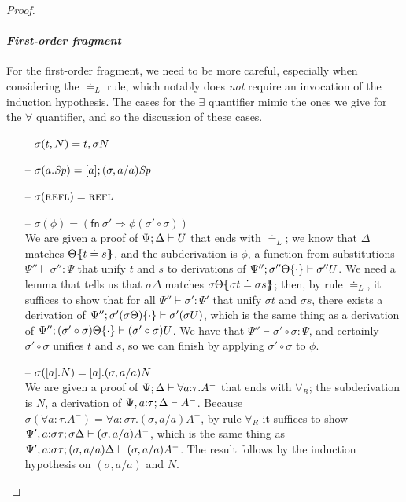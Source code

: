 \begin{proof}
\begin{itemize}
\end{itemize}

\paragraph{\it First-order fragment} For the first-order fragment, we need
to be more careful, especially when considering the 
$\doteq_L$ rule, which notably
does {\it not} require an invocation of the induction hypothesis. The cases
for the $\exists$ quantifier mimic the ones we give for the $\forall$
quantifier, and so the discussion of these cases.

\begin{itemize}

\item[--]
$\sigma({t},{N}) = {t},{\sigma{N}}$ 

\item[--]
$\sigma({a}.{{\it Sp}}) = [{a}]; {(\sigma, a/a){\it Sp}}$ 

\item[--]
$\sigma(\textsc{refl}) = \textsc{refl}$

\item[--]
$\sigma(\phi) = \left( \mathsf{fn}~\sigma' \Rightarrow \phi (\sigma'
  \circ \sigma) \right)$ \smallskip\\ We are given a proof of
${\Psi};{\Delta} \vdash {U}$ that ends with ${\doteq}_L$; we know that
$\Delta$ matches ${\Theta}\mbox{$\{\hspace{-4pt}\{$}{t \doteq s}\mbox{$\}\hspace{-4pt}\}$}$, and the
subderivation is $\phi$, a function from substitutions 
$\Psi'' \vdash \sigma'' : \Psi$ that unify $t$ and $s$ to derivations
of ${\Psi''};{{\sigma''\Theta}\{{\cdot}\}} \vdash {\sigma''{U}}$. We need a lemma
that tells us that $\sigma\Delta$ matches 
${\sigma\Theta}\mbox{$\{\hspace{-4pt}\{$}{\sigma t \doteq \sigma s}\mbox{$\}\hspace{-4pt}\}$}$; then, by rule
${\doteq}_L$, it suffices to show that for all 
$\Psi'' \vdash \sigma' : \Psi'$ that unify $\sigma t$ and $\sigma s$, 
there exists a derivation of 
${\Psi''};{{\sigma'(\sigma \Theta)}\{{\cdot}\}} \vdash {\sigma'(\sigma U)}$,
which is the same thing as a derivation of 
${\Psi''};{{(\sigma' \circ \sigma) \Theta}\{{\cdot}\}} \vdash {(\sigma' \circ \sigma) U}$. We have that 
$\Psi'' \vdash \sigma' \circ \sigma : \Psi$, and certainly 
$\sigma' \circ \sigma$ unifies $t$ and $s$, so we can finish by
applying $\sigma' \circ \sigma$ to $\phi$.\smallskip

\item[--]
$\sigma([{a}].{N}) = [{a}].{(\sigma, a/a)N}$ \smallskip\\ We are
given a proof of ${\Psi};{\Delta} \vdash {\forall a{:}\tau.A^-}$ 
that ends with $\forall_R$; the subderivation
is $N$, a derivation of ${\Psi,a{:}\tau};{\Delta} \vdash {A^-}$. Because
$\sigma(\forall{a}{:}{\tau}.A^-) 
 = \forall{a}{:}{\sigma\tau}.(\sigma, a/a){A^-}$,
by rule $\forall_R$ it suffices to show 
${\Psi', a{:}\sigma\tau};{\sigma\Delta} \vdash {(\sigma, a/a)A^-}$, 
which is the same thing
as ${\Psi', a{:}\sigma\tau};{(\sigma, a/a)\Delta} \vdash {(\sigma, a/a)A^-}$.
The result
follows by the induction hypothesis on $(\sigma, a/a)$ and $N$. \smallskip


\end{itemize}
\end{proof}
